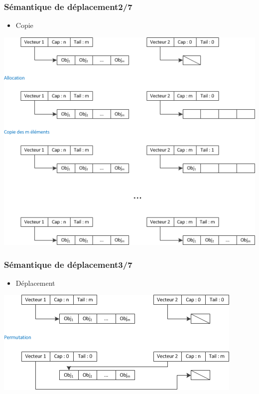 \documentclass[C++.tex]{subfiles}
\begin{document}
\begin{frame}
	\frametitle{Sémantique de déplacement\titlehfill{}2/7}
	\begin{itemize}
		\item Copie
	\end{itemize}

	\begin{center}
		\includegraphics[height=0.7\textheight]{input_src/copie.png}
	\end{center}
\end{frame}

\begin{frame}
	\frametitle{Sémantique de déplacement\titlehfill{}3/7}
	\begin{itemize}
		\item Déplacement
	\end{itemize}

	\begin{center}
		\includegraphics[height=0.4\textheight]{input_src/deplacement.png}
	\end{center}
\end{frame}
\end{document}
